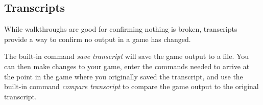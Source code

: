 \documentclass[letterpaper,10pt,english]{sphinxmanual}
\begin{document}
\subsection{Transcripts}
\label{fine_tuning:transcripts}
While walkthroughs are good for confirming nothing is broken, transcripts provide a way to confirm no output in a game has changed.

The built-in command \emph{save transcript} will save the game output to a file. You can then make changes to your game, enter the commands needed to arrive at the point in the game where you originally saved the transcript, and use the built-in command \emph{compare transcript} to compare the game output to the original transcript.



\renewcommand{\indexname}{Index}
\printindex
\end{document}

